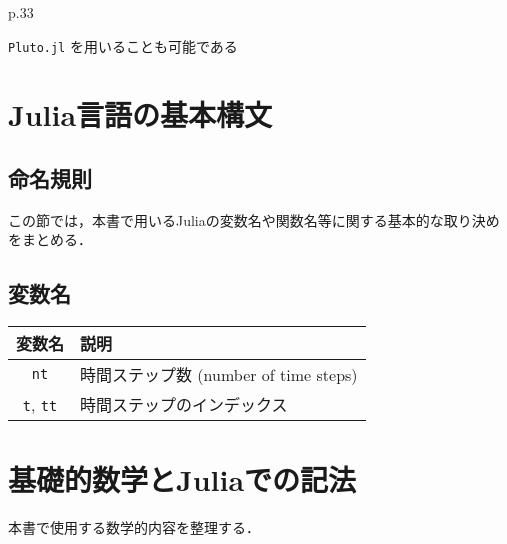\documentclass[titlepage]{ltjsbook}
\newcommand{\jl}{\lstinline[language=julia]}
\begin{document}
p.33

\jl{Pluto.jl} を用いることも可能である

\section{Julia言語の基本構文}


\subsection{命名規則}
この節では，本書で用いるJuliaの変数名や関数名等に関する基本的な取り決めをまとめる．

\subsection{変数名}
\begin{tabular}{cl} \hline
 変数名 & 説明\\\hline
  \jl{nt} & 時間ステップ数 (number of time steps)\\
  \jl{t}, \jl{tt} & 時間ステップのインデックス\\\hline
\end{tabular}

\section{基礎的数学とJuliaでの記法}
本書で使用する数学的内容を整理する．
\end{document}
